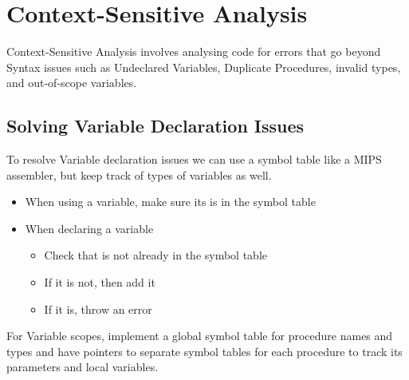 \documentclass{article}
\begin{document}
\section{Context-Sensitive Analysis}
Context-Sensitive Analysis involves analysing code for errors that go beyond Syntax issues such as Undeclared Variables, Duplicate Procedures, invalid types, and out-of-scope variables.  

\subsection*{Solving Variable Declaration Issues}
To resolve Variable declaration issues we can use a symbol table like a MIPS assembler, but keep track of types of variables as well.
\begin{itemize}
\item When using a variable, make sure its is in the symbol table 
\item When declaring a variable
\begin{itemize}
\item Check that is not already in the symbol table 
\item If it is not, then add it
\item If it is, throw an error  
\end{itemize}
\end{itemize}

For Variable scopes, implement a global symbol table for procedure names and types and have pointers to separate symbol tables for each procedure to track its parameters and local variables. 
\end{document}
